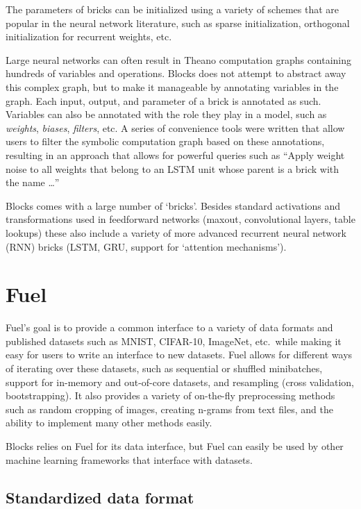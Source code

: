 \documentclass[twoside,11pt]{article}
\begin{document}
The parameters of bricks can be initialized using a variety of schemes that are
popular in the neural network literature, such as sparse initialization,
orthogonal initialization for recurrent weights, etc.

Large neural networks can often result in Theano computation graphs containing
hundreds of variables and operations. Blocks does not attempt to abstract away
this complex graph, but to make it manageable by annotating variables in the
graph. Each input, output, and parameter of a brick is annotated as such.
Variables can also be annotated with the role they play in a model, such as
\emph{weights}, \emph{biases}, \emph{filters}, etc. A series of convenience
tools were written that allow users to filter the symbolic computation graph
based on these annotations, resulting in an approach that allows for powerful
queries such as ``Apply weight noise to all weights that belong to an LSTM
unit whose parent is a brick with the name \ldots''

Blocks comes with a large number of `bricks'. Besides standard activations and
transformations used in feedforward networks (maxout, convolutional layers,
table lookups) these also include a variety of more advanced recurrent neural
network (RNN) bricks (LSTM, GRU, support for `attention mechanisms').


\section{Fuel}

Fuel's goal is to provide a common interface to a variety of data formats and
published datasets such as MNIST, CIFAR-10, ImageNet, etc.\ while making it easy
for users to write an interface to new datasets. Fuel allows for different ways
of iterating over these datasets, such as sequential or shuffled minibatches,
support for in-memory and out-of-core datasets, and resampling (cross
validation, bootstrapping). It also provides a variety of on-the-fly
preprocessing methods such as random cropping of images, creating n-grams from
text files, and the ability to implement many other methods easily.

Blocks relies on Fuel for its data interface, but Fuel can easily be used by
other machine learning frameworks that interface with datasets.

\subsection{Standardized data format}
\end{document}
